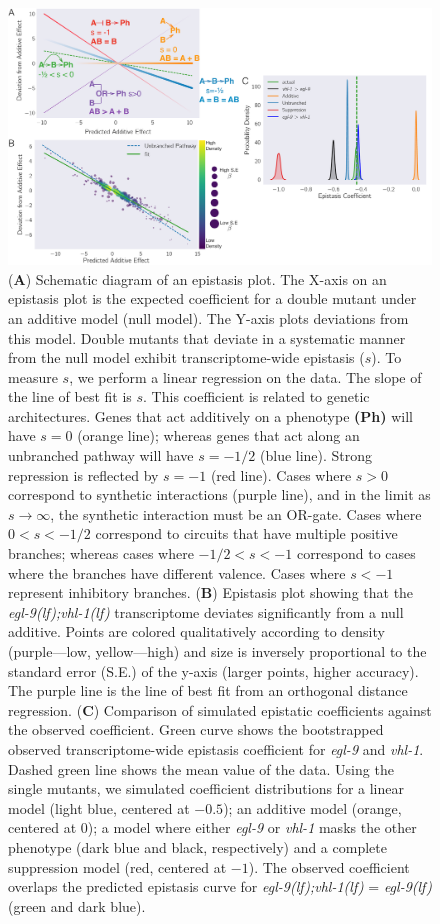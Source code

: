 \documentclass[10pt, onecolumn]{article}
\newcommand{\gene}[1]{\emph{#1}}
\newcommand{\egl}{\emph{\mbox{egl-9}(lf)}}
\newcommand{\eglvhl}{\emph{\mbox{egl-9(lf);vhl-1(lf)}}}
\begin{document}
\begin{figure}[tbhp]
\centering
\includegraphics[width=\linewidth]{../figs/egl9hif1-epistasis-horizontal.pdf}
\caption{
(\textbf{A}) Schematic diagram of an epistasis plot. The X-axis on an epistasis
plot is the expected coefficient for a double mutant under an additive model
(null model). The Y-axis plots deviations from this model. Double mutants that
deviate in a systematic manner from the null model exhibit transcriptome-wide epistasis
($s$). To measure $s$, we perform a linear regression on the data. The slope of
the line of best fit is $s$. This coefficient is related to genetic architectures.
Genes that act additively on a phenotype \textbf{(Ph)} will have $s=0$ (orange
line); whereas
genes that act along an unbranched pathway will have $s=-1/2$ (blue line).
Strong
repression is reflected by $s=-1$ (red line). Cases where $s>0$ correspond to
synthetic interactions (purple line), and in the limit as $s\rightarrow\infty$,
the synthetic interaction
must be an OR-gate. Cases where $0 < s < -1/2$ correspond to circuits
that have multiple positive branches; whereas cases where
$-1/2<s< -1$ correspond to cases where the branches have different valence.
Cases where $s < -1$ represent inhibitory branches.
(\textbf{B}) Epistasis plot showing
that the \eglvhl{} transcriptome deviates significantly from a null additive.
Points are colored qualitatively according to density (purple---low,
yellow---high) and size is inversely proportional to the standard
error (S.E.) of the y-axis (larger points, higher accuracy). The purple line
is the line of best fit from an orthogonal distance regression.
(\textbf{C}) Comparison of simulated epistatic coefficients against the observed
coefficient. Green curve shows the bootstrapped observed transcriptome-wide epistasis
coefficient for \gene{egl-9} and \gene{vhl-1}. Dashed green line shows the mean
value of the data. Using the single mutants, we simulated coefficient
distributions for a linear model (light blue, centered at $-0.5$);
an additive model (orange, centered at 0); a model where either
\gene{egl-9} or \gene{vhl-1} masks the other phenotype (dark blue and black,
respectively) and a complete suppression model (red, centered at $-1$).
The observed coefficient overlaps the predicted epistasis curve for
\eglvhl{} = \egl{} (green and dark blue).
}
\label{fig:egl9epistasis}
\end{figure}
\end{document}
